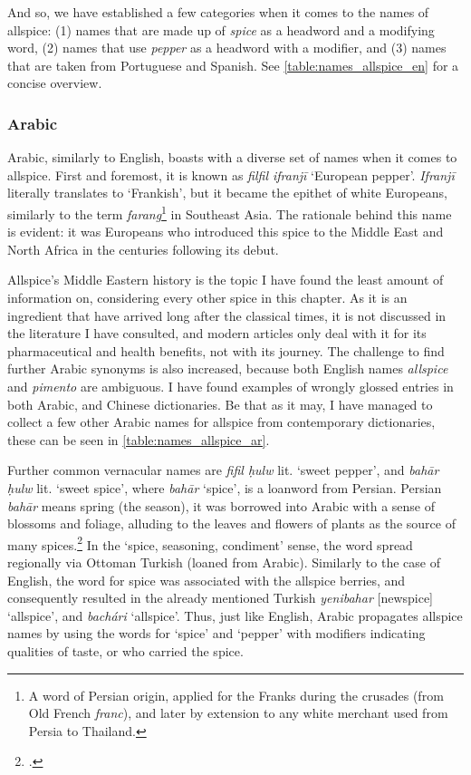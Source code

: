 And so, we have established a few categories when it comes to the names of allspice: (1) names that are made up of \textit{spice} as a headword and a modifying word, (2) names that use \textit{pepper} as a headword with a modifier, and (3) names that are taken from Portuguese and Spanish. See \cref{table:names_allspice_en} for a concise overview.



\subsubsection{Arabic}



Arabic, similarly to English, boasts with a diverse set of names when it comes to allspice. First and foremost, it is known as \textit{filfil ifranjī} `European pepper'. \textit{Ifranjī} literally translates to `Frankish', but it became the epithet of white Europeans, similarly to the term \textit{farang}\footnote{A word of Persian origin, applied for the Franks during the crusades (from Old French \textit{franc}), and later by extension to any white merchant used from Persia to Thailand.} in Southeast Asia. The rationale behind this name is evident: it was Europeans who introduced this spice to the Middle East and North Africa in the centuries following its debut. %

Allspice's Middle Eastern history is the topic I have found the least amount of information on, considering every other spice in this chapter. As it is an ingredient that have arrived long after the classical times, it is not discussed in the literature I have consulted, and modern articles only deal with it for its pharmaceutical and health benefits, not with its journey. The challenge to find further Arabic synonyms is also increased, because both English names \textit{allspice} and \textit{pimento} are ambiguous. I have found examples of wrongly glossed entries in both Arabic, and Chinese dictionaries. Be that as it may, I have managed to collect a few other Arabic names for allspice from contemporary dictionaries, these can be seen in \cref{table:names_allspice_ar}. 

Further common vernacular names are \textit{fifil ḥulw} lit. `sweet pepper', and \textit{bahār ḥulw} lit. `sweet spice', where \textit{bahār} `spice', is a loanword from Persian. Persian  \textit{bahār} means spring (the season), it was borrowed into Arabic with a sense of blossoms and foliage, alluding to the leaves and flowers of plants as the source of many spices.\footcite[121]{dozy_supplement_1881} In the `spice, seasoning, condiment' sense, the word spread regionally via Ottoman Turkish (loaned from Arabic). Similarly to the case of English, the word for spice was associated with the allspice berries, and consequently resulted in the already mentioned Turkish \textit{yenibahar} [newspice] `allspice', and  \textit{bachári} `allspice'. Thus, just like English, Arabic propagates allspice names by using the words for `spice' and `pepper' with modifiers indicating qualities of taste, or who carried the spice.

